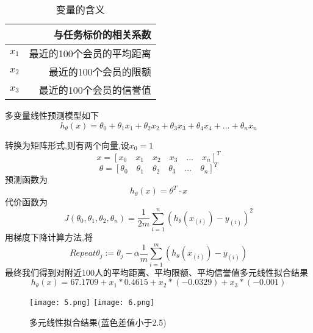 \documentclass{cumcmthesis}
\begin{document}
\begin{table}[!htbp]
 \centering
	\caption{变量的含义}\label{Tab:4}
	\begin{tabular}{lr}
		\toprule[1.5pt]
		& {与任务标价的相关系数} \\
		\midrule[1pt]
		$x_1$ & 最近的100个会员的平均距离 \\
		$x_2$ & 最近的100个会员的限额 \\
		$x_3$ & 最近的100个会员的信誉值 \\
		\bottomrule[1.5pt]
	\end{tabular}%
\end{table}

多变量线性预测模型如下
\begin{equation}
\left.
h_{\theta}(x) =\theta_0+\theta_1x_1+\theta_2x_2+\theta_3x_3+\theta_4x_4+... +\theta_n x_n
\right.
\end{equation}

转换为矩阵形式,则有两个向量,设$x_0=1$
\[x=\left[x_0\quad	x_1\quad	x_2\quad x_3	\quad	...\quad x_n \right]^T\]
\[\theta=\left[\theta_0\quad	\theta_1\quad	\theta_2\quad \theta_3	\quad	...\quad \theta_n \right]^T\]
预测函数为
\begin{equation}
\left.
h_\theta \left(x\right)=\theta^T·x
\right.
\end{equation}
代价函数为
\begin{equation}
\left.
J\left(\theta_0,\theta_1,\theta_2,\theta_n \right)=\frac{1}{2m}\sum_{i=1}^{n} \left(h_\theta\left(x_{\left(i\right)}\right)-y_{\left(i\right)}\right)^2
\right.
\end{equation}
用梯度下降计算方法,将
\begin{equation}
\left.
Repeat\theta_j:=\theta_j-\alpha\frac{1}{m} \sum_{i=1}^{m} \left(h_\theta\left(x_{\left(i\right)}\right)-y_{\left(i\right)}\right)
\right.
\end{equation}
最终我们得到对附近100人的平均距离、平均限额、平均信誉值多元线性拟合结果
\begin{equation}
\left.
h_\theta\left(x\right) = 67.1709 + x_1*0.4615 +x_2*(-0.0329)+x_3*(-0.001)
\right.
\end{equation}

\begin{figure}[!htbp]
	\centering
	\texttt{[image: 5.png]}
	\texttt{[image: 6.png]}
	\caption{多元线性拟合结果(蓝色差值小于2.5)}\label{Fig:4}
\end{figure}
\end{document}
